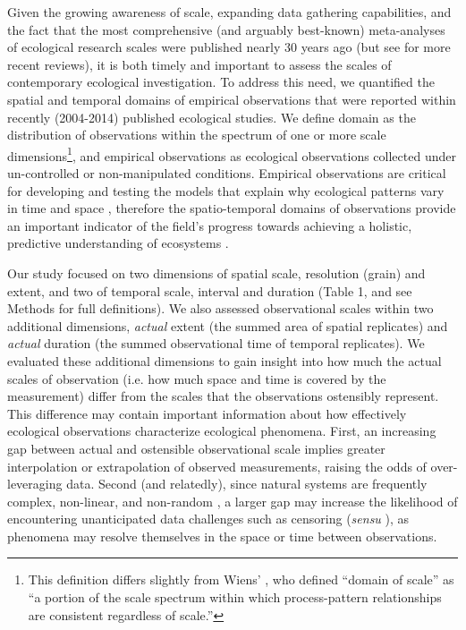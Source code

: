 \documentclass[12pt]{article}
\begin{document}
Given the growing awareness of scale, expanding data gathering capabilities, and the fact that the most comprehensive (and arguably best-known) meta-analyses \cite{tilman_ecological_1989,kareiva_spatial_1988} of ecological research scales were published nearly 30 years ago (but see \cite{porter_crop_2005,sandel_scale_2009} for more recent reviews), it is both timely and important to assess the scales of contemporary ecological investigation. To address this need, we quantified the spatial and temporal domains of empirical observations that were reported within recently (2004-2014) published ecological studies. We define domain as the distribution of observations within the spectrum of one or more scale dimensions\footnote{This definition differs slightly from Wiens' \cite{wiens_spatial_1989}, who defined ``domain of scale'' as ``a portion of the scale spectrum within which process-pattern relationships are consistent regardless of scale.''}, and empirical observations as ecological observations collected under un-controlled or non-manipulated conditions. Empirical observations are critical for developing and testing the models that explain why ecological patterns vary in time and space \cite{levin_problem_1992, tilman_ecological_1989}, therefore the spatio-temporal domains of observations provide an important indicator of the field's progress towards achieving a holistic, predictive understanding of ecosystems \cite{chave_problem_2013,levin_problem_1992}. 

Our study focused on two dimensions of spatial scale, resolution (grain) and extent, and two of temporal scale, interval and duration (Table 1, and see Methods for full definitions). We also assessed observational scales within two additional dimensions, \emph{actual} extent (the summed area of spatial replicates) and \emph{actual} duration (the summed observational time of temporal replicates). We evaluated these additional dimensions to gain insight into how much the actual scales of observation (i.e. how much space and time is covered by the measurement) differ from the scales that the observations ostensibly represent. This difference may contain important information about how effectively ecological observations characterize ecological phenomena. First, an increasing gap between actual and ostensible observational scale implies greater interpolation or extrapolation of observed measurements, raising the odds of over-leveraging data. Second (and relatedly), since natural systems are frequently complex, non-linear, and non-random \cite{levin_ecosystems_1998,pringle_spatial_2017,rietkerk_regular_2008}, a larger gap may increase the likelihood of encountering unanticipated data challenges such as censoring (\emph{sensu} \cite{efron_efficiency_1977}), as phenomena may resolve themselves in the space or time between observations. 
\end{document}
